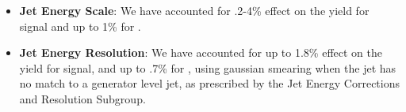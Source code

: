 \begin{itemize}

\item \textbf{Jet Energy Scale}: We have accounted for .2-4\% effect on the yield for signal and up to 1\% for \ttbar. %


\item \textbf{Jet Energy Resolution}: We have accounted for up to 1.8\% effect on the yield for signal, and up to .7\% for \ttbar, using gaussian smearing when the jet has no match to a generator level jet, as prescribed by the Jet Energy Corrections and Resolution Subgroup.



\end{itemize}
